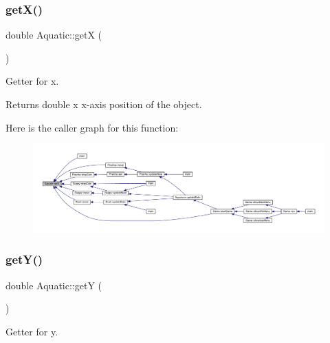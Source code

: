 \subsubsection{\texorpdfstring{get\+X()}{getX()}}
{\footnotesize\ttfamily double Aquatic\+::getX (\begin{DoxyParamCaption}{ }\end{DoxyParamCaption})}



Getter for x. 

\begin{DoxyReturn}{Returns}
double x x-\/axis position of the object. 
\end{DoxyReturn}
Here is the caller graph for this function\+:
\nopagebreak
\begin{figure}[H]
\begin{center}
\leavevmode
\includegraphics[width=350pt]{class_aquatic_ab59ba97a4876a0e3ae8b85c1915a82f9_icgraph}
\end{center}
\end{figure}
\mbox{\label{class_aquatic_aadfede87649072d59192d923200b6fc3}} 
\subsubsection{\texorpdfstring{get\+Y()}{getY()}}
{\footnotesize\ttfamily double Aquatic\+::getY (\begin{DoxyParamCaption}{ }\end{DoxyParamCaption})}



Getter for y. 

